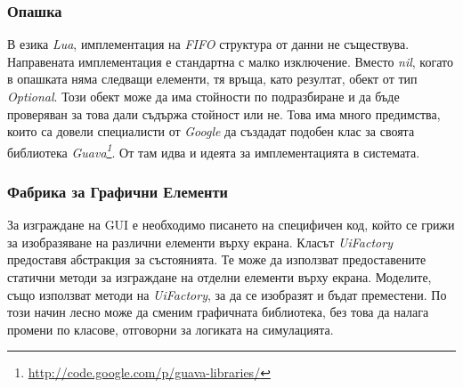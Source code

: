 		
		\subsubsection{Опашка}
		
		В езика \emph{Lua}, имплементация на \emph{FIFO} структура от данни не съществува. Направената имплементация
		е стандартна с малко изключение. Вместо \emph{nil}, когато в опашката няма следващи елементи, тя връща, като резултат, 
		обект от тип \emph{Optional}. Този обект може да има стойности по подразбиране и да бъде проверяван за това дали 
		съдържа стойност или не. Това има много предимства, които са довели специалисти от \emph{Google} да 
		създадат подобен клас за своята библиотека
		\emph{Guava\footnote{\url{http://code.google.com/p/guava-libraries/}}}. От там идва и идеята за имплементацията в системата.
		
		\subsubsection{Фабрика за Графични Елементи}
		
		За изграждане на \ac{GUI} е необходимо писането на специфичен код, който се грижи за изобразяване на различни елементи
		върху екрана. Класът \emph{UiFactory} предоставя абстракция за състоянията. Те може да използват предоставените статични методи за 	
		изграждане на отделни елементи върху екрана. Моделите, също използват методи на \emph{UiFactory}, за да се изобразят и бъдат преместени.
		По този начин лесно може да сменим графичната библиотека, без това да налага промени по класове, отговорни за логиката на симулацията.